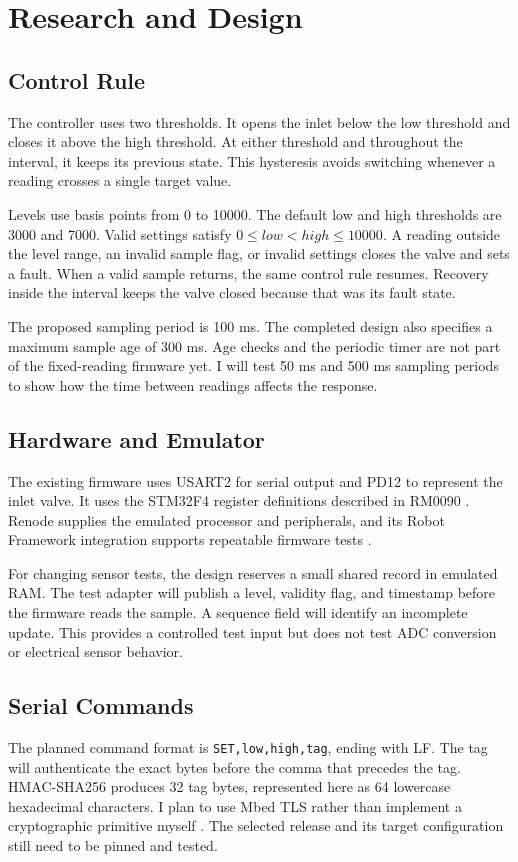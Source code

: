 \documentclass[conference]{IEEEtran}
\begin{document}
\section{Research and Design}
\subsection{Control Rule}
The controller uses two thresholds. It opens the inlet below the low threshold and closes it above the high threshold. At either threshold and throughout the interval, it keeps its previous state. This hysteresis avoids switching whenever a reading crosses a single target value.

Levels use basis points from 0 to 10000. The default low and high thresholds are 3000 and 7000. Valid settings satisfy $0 \leq low < high \leq 10000$. A reading outside the level range, an invalid sample flag, or invalid settings closes the valve and sets a fault. When a valid sample returns, the same control rule resumes. Recovery inside the interval keeps the valve closed because that was its fault state.

The proposed sampling period is 100 ms. The completed design also specifies a maximum sample age of 300 ms. Age checks and the periodic timer are not part of the fixed-reading firmware yet. I will test 50 ms and 500 ms sampling periods to show how the time between readings affects the response.

\subsection{Hardware and Emulator}
The existing firmware uses USART2 for serial output and PD12 to represent the inlet valve. It uses the STM32F4 register definitions described in RM0090 \cite{stm32}. Renode supplies the emulated processor and peripherals, and its Robot Framework integration supports repeatable firmware tests \cite{renode}.

For changing sensor tests, the design reserves a small shared record in emulated RAM. The test adapter will publish a level, validity flag, and timestamp before the firmware reads the sample. A sequence field will identify an incomplete update. This provides a controlled test input but does not test ADC conversion or electrical sensor behavior.

\subsection{Serial Commands}
The planned command format is \texttt{SET,low,high,tag}, ending with LF. The tag will authenticate the exact bytes before the comma that precedes the tag. HMAC-SHA256 produces 32 tag bytes, represented here as 64 lowercase hexadecimal characters. I plan to use Mbed TLS rather than implement a cryptographic primitive myself \cite{mbedtls}. The selected release and its target configuration still need to be pinned and tested.
\end{document}
